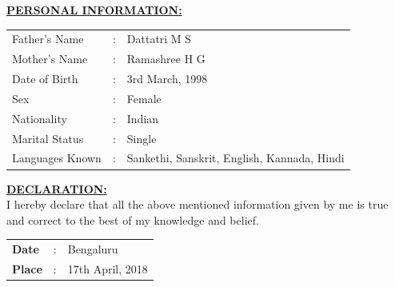 \documentclass[letterpaper,11pt,oneside]{article}
\begin{document}
	
	\vspace{2ex}
	
	\textbf{\underline{\Large PERSONAL INFORMATION:}}\\
	
	\vspace{2ex}
	
	
	\begin{tabular}{l l l}
		
		Father’s Name &   :  &Dattatri M S\\ 
		Mother’s Name  & :  &Ramashree H G\\
		Date of Birth	&:  &3rd March, 1998\\
		Sex 			&:  &Female\\
		Nationality		&:  &Indian\\
		Marital Status 	&:  &Single\\
		Languages Known	&:  &Sankethi, Sanskrit, English, Kannada, Hindi\\
		
	\end{tabular}
	
	\vspace{2ex}
	\textbf{\underline{\Large DECLARATION:}}\\
	\vspace{2ex}
	I hereby declare that all the above mentioned information given by me is true and correct to the best of my knowledge and belief.
	\\
	 
	\vspace{2ex}
	
	\begin{tabular}{l l l}
		\textbf{\small Date} & : & Bengaluru\\
		\textbf{\small Place} & : & 17th April, 2018\\
	\end{tabular}
\end{document}
